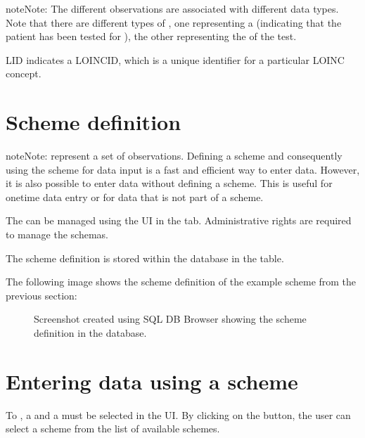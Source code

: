 \documentclass[a4paper,10pt,english]{sphinxmanual}
\begin{document}
\begin{sphinxadmonition}{note}{Note:}
\sphinxAtStartPar
The different observations are associated with different data types. Note that there are different types of , one representing a  (indicating that the patient has been tested for ), the other representing the  of the test.

\sphinxAtStartPar
LID indicates a LOINC\sphinxhyphen{}ID, which is a unique identifier for a particular LOINC concept.
\end{sphinxadmonition}


\section{Scheme definition}
\label{\detokenize{TechnicalDetails:scheme-definition}}
\begin{sphinxadmonition}{note}{Note:}
\sphinxAtStartPar
{} represent a set of observations. Defining a scheme and consequently using the scheme for data input is a fast and efficient way to enter data. However, it is also possible to enter data without defining a scheme. This is useful for one\sphinxhyphen{}time data entry or for data that is not part of a scheme.
\end{sphinxadmonition}

\sphinxAtStartPar
The  can be managed using the UI in the  tab. Administrative rights are required to manage the schemas.

\sphinxAtStartPar
The scheme definition is stored within the database in the  table.

\sphinxAtStartPar
The following image shows the scheme definition of the example scheme from the previous section:

\begin{figure}[htbp]
\centering
\capstart

\noindent{}
\caption{Screenshot created using SQL DB Browser showing the scheme definition in the database.}\label{\detokenize{TechnicalDetails:id6}}\end{figure}


\section{Entering data using a scheme}
\label{\detokenize{TechnicalDetails:entering-data-using-a-scheme}}
\sphinxAtStartPar
To , a  and a  must be selected in the UI. By clicking on the  button, the user can select a scheme from the list of available schemes.
\end{document}
